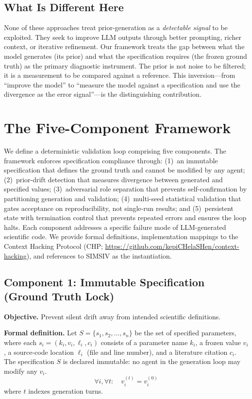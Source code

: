 \documentclass[11pt,a4paper]{article}
\begin{document}
\subsection{What Is Different Here}

None of these approaches treat prior-generation as a \textit{detectable signal} to be exploited. They seek to improve LLM outputs through better prompting, richer context, or iterative refinement. Our framework treats the gap between what the model generates (its prior) and what the specification requires (the frozen ground truth) as the primary diagnostic instrument. The prior is not noise to be filtered; it is a measurement to be compared against a reference. This inversion---from ``improve the model'' to ``measure the model against a specification and use the divergence as the error signal''---is the distinguishing contribution.

\section{The Five-Component Framework}

We define a deterministic validation loop comprising five components. The framework enforces specification compliance through: (1)~an immutable specification that defines the ground truth and cannot be modified by any agent; (2)~prior-drift detection that measures divergence between generated and specified values; (3)~adversarial role separation that prevents self-confirmation by partitioning generation and validation; (4)~multi-seed statistical validation that gates acceptance on reproducibility, not single-run results; and (5)~persistent state with termination control that prevents repeated errors and ensures the loop halts. Each component addresses a specific failure mode of LLM-generated scientific code. We provide formal definitions, implementation mappings to the Context Hacking Protocol (CHP; \url{https://github.com/kepiCHelaSHen/context-hacking}), and references to SIMSIV as the instantiation.

\subsection{Component 1: Immutable Specification (Ground Truth Lock)}

\textbf{Objective.} Prevent silent drift away from intended scientific definitions.

\textbf{Formal definition.} Let $S = \{s_1, s_2, \ldots, s_n\}$ be the set of specified parameters, where each $s_i = (k_i, v_i, \ell_i, c_i)$ consists of a parameter name $k_i$, a frozen value $v_i$, a source-code location $\ell_i$ (file and line number), and a literature citation $c_i$. The specification $S$ is declared immutable: no agent in the generation loop may modify any $v_i$.
\begin{equation}
\forall i, \forall t: \quad v_i^{(t)} = v_i^{(0)}
\end{equation}
where $t$ indexes generation turns.
\end{document}
